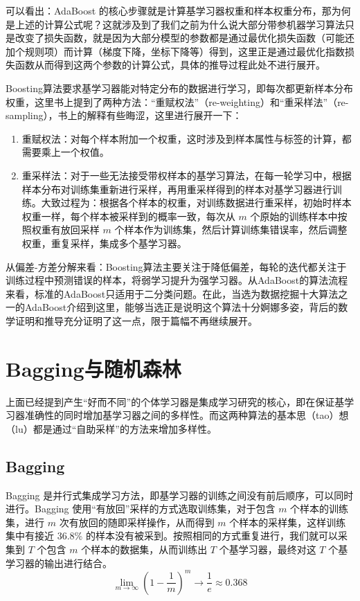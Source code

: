 \documentclass[12pt, a4paper]{article} %
\begin{document}
可以看出：AdaBoost 的核心步骤就是计算基学习器权重和样本权重分布，那为何是上述的计算公式呢？这就涉及到了我们之前为什么说大部分带参机器学习算法只是改变了损失函数，就是因为大部分模型的参数都是通过最优化损失函数（可能还加个规则项）而计算（梯度下降，坐标下降等）得到，这里正是通过最优化指数损失函数从而得到这两个参数的计算公式，具体的推导过程此处不进行展开。

Boosting算法要求基学习器能对特定分布的数据进行学习，即每次都更新样本分布权重，这里书上提到了两种方法：“重赋权法”（re-weighting）和“重采样法”（re-sampling），书上的解释有些晦涩，这里进行展开一下：
\begin{enumerate}[\hspace*{2em} i.]
    \item 重赋权法：对每个样本附加一个权重，这时涉及到样本属性与标签的计算，都需要乘上一个权值。
    \item 重采样法：对于一些无法接受带权样本的基学习算法，在每一轮学习中，根据样本分布对训练集重新进行采样，再用重采样得到的样本对基学习器进行训练。大致过程为：根据各个样本的权重，对训练数据进行重采样，初始时样本权重一样，每个样本被采样到的概率一致，每次从 $m$ 个原始的训练样本中按照权重有放回采样 $m$ 个样本作为训练集，然后计算训练集错误率，然后调整权重，重复采样，集成多个基学习器。
\end{enumerate}

从偏差-方差分解来看：Boosting算法主要关注于降低偏差，每轮的迭代都关注于训练过程中预测错误的样本，将弱学习提升为强学习器。从AdaBoost的算法流程来看，标准的AdaBoost只适用于二分类问题。在此，当选为数据挖掘十大算法之一的AdaBoost介绍到这里，能够当选正是说明这个算法十分婀娜多姿，背后的数学证明和推导充分证明了这一点，限于篇幅不再继续展开。

\section{Bagging与随机森林}

上面已经提到产生“好而不同”的个体学习器是集成学习研究的核心，即在保证基学习器准确性的同时增加基学习器之间的多样性。而这两种算法的基本思（tao）想（lu）都是通过“自助采样”的方法来增加多样性。

\subsection{Bagging}

Bagging 是并行式集成学习方法，即基学习器的训练之间没有前后顺序，可以同时进行。Bagging 使用“有放回”采样的方式选取训练集，对于包含 $m$ 个样本的训练集，进行 $m$ 次有放回的随即采样操作，从而得到 $m$ 个样本的采样集，这样训练集中有接近 36.8\% 的样本没有被采到。按照相同的方式重复进行，我们就可以采集到 $T$ 个包含 $m$ 个样本的数据集，从而训练出 $T$ 个基学习器，最终对这 $T$ 个基学习器的输出进行结合。
\begin{equation*}
    \lim_{m \to \infty} (1 - \frac{1}{m})^m \to \frac{1}{e} \approx 0.368
\end{equation*}
\end{document}
